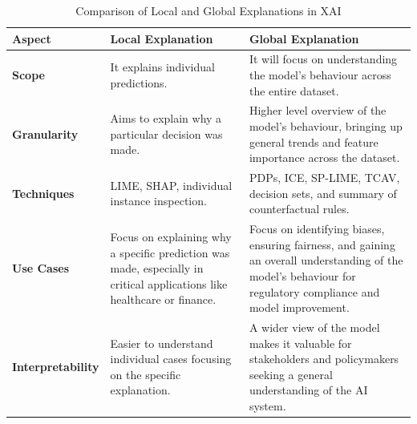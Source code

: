 \documentclass[10pt,journal,compsoc]{IEEEtran}
\begin{document}
\begin{table}[H]
    \centering
    \small
    \begin{tabularx}{\columnwidth}{|p{1.8cm}|X|X|}
        \hline
        \textbf{Aspect}           & \textbf{Local Explanation}                                                                                              & \textbf{Global Explanation}                                                                                                                                    \\
        \hline
        \textbf{Scope}            & It explains individual predictions.                                                                                     & It will focus on understanding the model's behaviour across the entire dataset.                                                                                \\
        \hline
        \textbf{Granularity}      & Aims to explain why a particular decision was made.                                                                     & Higher level overview of the model's behaviour, bringing up general trends and feature importance across the dataset.                                          \\
        \hline
        \textbf{Techniques}       & LIME, SHAP, individual instance inspection.                                                                             & PDPs, ICE, SP-LIME, TCAV, decision sets, and summary of counterfactual rules.\cite{phillips2020four}                                                               \\
        \hline
        \textbf{Use Cases}        & Focus on explaining why a specific prediction was made, especially in critical applications like healthcare or finance. & Focus on identifying biases, ensuring fairness, and gaining an overall understanding of the model's behaviour for regulatory compliance and model improvement. \\
        \hline
        \textbf{Interpretability} & Easier to understand individual cases focusing on the specific explanation.                                        & A wider view of the model makes it valuable for stakeholders and policymakers seeking a general understanding of the AI system.                                \\
        \hline
    \end{tabularx}
    \caption{Comparison of Local and Global Explanations in XAI}
    \label{tab:xai_comparison}
\end{table}
\end{document}

